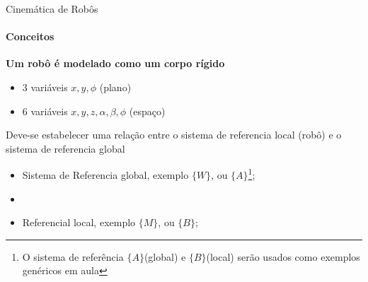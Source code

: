 \documentclass{beamer}
\begin{document}
\begin{frame}{Cinemática de Robôs}
    \framesubtitle{Conceitos}
    \textbf{Um robô é modelado como um corpo rígido}
        \begin{itemize}
            \item 3 variáveis $x, y,\phi$ (plano)
            \item 6 variáveis $x,y,z, \alpha, \beta, \phi$ (espaço)
        \end{itemize}
    Deve-se estabelecer uma relação entre o sistema de referencia local (robô) e o sistema de referencia global
        \begin{itemize}
            \item Sistema de Referencia global, exemplo $\{W\}$, ou $\{A\}$\footnote{O sistema de referência $\{A\}$(global) e $\{B\}$(local) serão usados como exemplos genéricos em aula};
            \item \item Referencial local, exemplo $\{M\}$, ou $\{B\}$;
        \end{itemize}
\end{frame}
\end{document}

